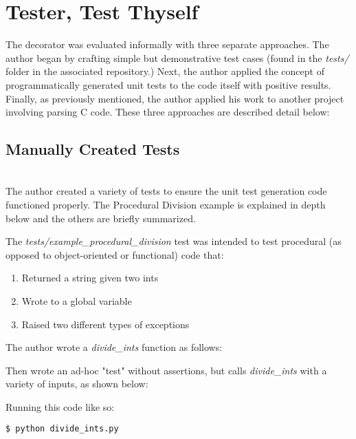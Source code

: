 \section{Tester, Test Thyself}\label{sec:evaluation}

The decorator was evaluated informally with three separate approaches.
The author began by crafting simple but demonstrative test cases 
(found in the \textit{tests/} folder in the associated repository.) Next,
the author applied the concept of programmatically generated unit tests
to the code itself with positive results.  Finally, as previously mentioned, 
the author applied his work to another project involving parsing C code. 
These three approaches are described detail below:

\subsection{Manually Created Tests}\label{sec:eval-1}
\hfill\\
The author created a variety of tests to ensure the unit test generation 
code functioned properly. The Procedural Division example is explained in depth
below and the others are briefly summarized.

The \textit{tests/example\_procedural\_division} test was intended 
to test procedural (as opposed to object-oriented or functional) code that:  

\begin{enumerate}
    \item Returned a string given two ints
    \item Wrote to a global variable
    \item Raised two different types of exceptions
\end{enumerate}

The author wrote a \textit{divide\_ints} function as follows:



Then wrote an ad-hoc "test" without assertions, but calls 
\textit{divide\_ints} with a variety of inputs, as shown below:



Running this code like so:

\begin{lstlisting}[language=bash, caption={Executing example to create unit test}]
    $ python divide_ints.py
\end{lstlisting}
    
